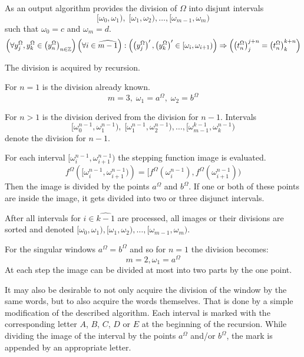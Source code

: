 \documentclass[text.tex]{subfiles}
\begin{document}
As an output algorithm provides the division of $\Omega$ into disjunt intervals $$[\omega_0,\omega_1),\;[\omega_1,\omega_2), \dots, [\omega_{m-1},\omega_m)$$ such that $\omega_0 = c$ and $\omega_m = d$.
$$\left(\forall y_j^\Omega,y_k^\Omega\in\left(y_n^\Omega\right)_{n\in\mathbb{Z}} \right)\left(\forall i\in\widehat{m-1}\right): \left(\left({y_j^\Omega}\right)',\left({y_k^\Omega}\right)' \in [\omega_i,\omega_{i+1})\right) \Rightarrow \left(\left(t_n^\Omega\right)_j^{j+n} = \left(t_n^\Omega\right)_k^{k+n}\right)$$

The division is acquired by recursion. 

For $n=1$ is the division already known.
$$m=3,\; \omega_1 = a^\Omega,\; \omega_2 = b^\Omega$$

For $n>1$ is the division derived from the division for $n-1$.
Intervals 
$$[\omega_0^{n-1},\omega_1^{n-1}),\;[\omega_1^{n-1},\omega_2^{n-1}), \dots, [\omega_{m-1}^{k-1},\omega_{k}^{n-1})$$ denote the division for $n-1$.

For each interval $[\omega_i^{n-1},\omega_{i+1}^{n-1})$ the stepping function image is evaluated. 
$$f^\Omega\left([\omega_i^{n-1},\omega_{i+1}^{n-1})\right) = [f^\Omega(\omega_i^{n-1}),f^\Omega(\omega_{i+1}^{n-1}))$$
Then the image is divided by the points $a^\Omega$ and $b^\Omega$. If one or both of these points are inside the image, it gets divided into two or three disjunct intervals. 

After all intervals for $i\in \widehat{k-1}$ are processed, all images or their divisions are sorted and denoted $[\omega_0,\omega_1), [\omega_1,\omega_2), \dots, [\omega_{m-1},\omega_m)$.

For the singular windows $a^\Omega = b^\Omega$ and so for $n=1$ the division becomes:
$$m=2, \omega_1 = a^\Omega$$
At each step the image can be divided at most into two parts by the one point.

It may also be desirable to not only acquire the division of the window by the same words, but to also acquire the words themselves. That is done by a simple modification of the described algorithm. Each interval is marked with the corresponding letter $A$, $B$, $C$, $D$ or $E$ at the beginning of the recursion. While dividing the image of the interval by the points $a^\Omega$ and/or $b^\Omega$, the mark is appended by an appropriate letter.
\end{document}
